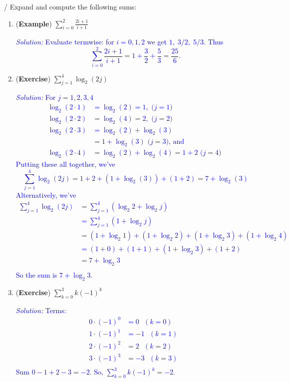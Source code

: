 \documentclass[10pt]{article}
\begin{document}
{\example / \exercise} Expand and compute the following sums:
    \begin{enumerate}
    \item[(a)] ({\bf\color{blue}Example}) $\displaystyle\sum_{i=0}^2 \frac{2i+1}{i+1}$
        \par\noindent\textcolor{blue}{\emph{Solution:} Evaluate termwise: for $i=0,1,2$ we get $1,\;3/2,\;5/3$. Thus
        \[
        \sum_{i=0}^2 \frac{2i+1}{i+1}=1+\frac32+\frac53=\frac{25}{6}.
        \]}
        \vfill
    \item[(b)] ({\bf\color{blue}Exercise}) $\displaystyle\sum_{j=1}^4 \log_2\left( 2j\right)$
        \par\noindent\textcolor{blue}{\emph{Solution:} For $j = 1,2,3,4$
        \begin{align*}
        \log_2(2\cdot 1)&= \log_2(2) = 1, \text{ ($j = 1$) }\\
        \log_2(2\cdot 2) &= \log_2(4) = 2, \text{ ($j = 2$) }\\
        \log_2(2\cdot 3) &= \log_2(2) + \log_2(3)\\
        &= 1 + \log_2(3) \text{ ($j = 3$),  and }\\
        \log_2(2\cdot 4) &= \log_2(2) + \log_2(4)= 1 + 2 \text{ ($j = 4$) }
        \end{align*}
        Putting these all together, we've 
        $$\displaystyle\sum_{j=1}^4 \log_2\left( 2j\right) = 1 + 2 + (1 + \log_2(3)) + (1 + 2) = 7 + \log_2(3)$$
        Alternatively, we've 
        \begin{align*}
        \sum_{j=1}^4 \log_2(2j)&= \sum_{j=1}^4 (\log_2 2 +\log_2 j)\\
        &= \sum_{j=1}^4 (1+\log_2 j)\\
        &= (1+\log_2 1) + (1 + \log_2 2) + (1 + \log_2 3) + (1 + \log_2 4)\\
        &= (1 + 0) + (1 + 1) + (1 + \log_2 3) + (1 + 2)\\
        &= 7+\log_2 3\\
        \end{align*}
        So the sum is $7+\log_2 3$. }
        \vfill
        
    \item[(c)] ({\bf\color{blue}Exercise}) $\displaystyle\sum_{k=0}^3 k(-1)^k$
        \par\noindent\textcolor{blue}{\emph{Solution:} Terms: 
        \begin{align*}
            0\cdot (-1)^{0} &= 0 \text{ $(k = 0)$ }\\
            1\cdot (-1)^{1} &= -1 \text{ $(k = 1)$ }\\
            2\cdot (-1)^{2} &= 2 \text{ $(k = 2)$ }\\
            3\cdot (-1)^{3} &= -3 \text{ $(k = 3)$ }\\
        \end{align*}
        Sum $0-1+2-3=-2$. So, $\displaystyle\sum_{k=0}^3 k(-1)^k = -2$.}
        \vfill
    \end{enumerate}
    
\end{document}

